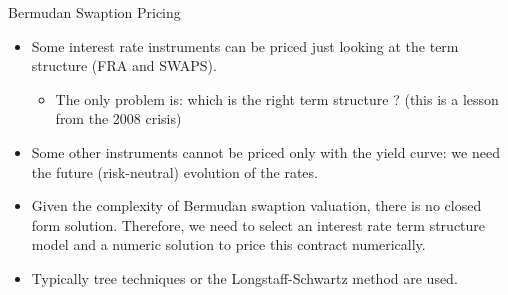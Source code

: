 \documentclass{beamer}
\begin{document}
\begin{frame}{Bermudan Swaption Pricing}
	\begin{itemize}
		\item Some interest rate instruments can be priced just looking at the term structure (FRA and SWAPS).
		\begin{itemize}
			\item The only problem is: which is the right term structure ? (this is a lesson from the 2008 crisis) 
		\end{itemize}
		\item Some other instruments cannot be priced only with the yield curve: we need the future (risk-neutral) evolution of the rates.
		\item Given the complexity of Bermudan swaption valuation, there is no closed form solution. Therefore, we need to select an interest rate term structure model and a numeric solution to price this contract numerically.		
		\item Typically tree techniques or the Longstaff-Schwartz method are used.
	\end{itemize}
\end{frame}
\end{document}
